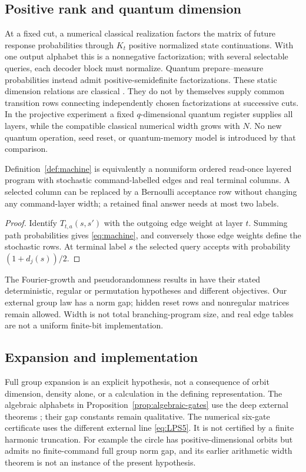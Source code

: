 \subsection{Positive rank and quantum dimension}
At a fixed cut, a numerical classical realization factors the matrix
of future response probabilities through $K_t$ positive normalized
state continuations. With one output alphabet this is a nonnegative
factorization; with several selectable queries, each decoder block
must normalize. Quantum prepare--measure probabilities instead admit
positive-semidefinite factorizations. These static dimension
relations are classical \cite{FMPST}. They do not by themselves
supply common transition rows connecting independently chosen
factorizations at successive cuts. In the projective experiment a
fixed $q$-dimensional quantum register supplies all layers, while the
compatible classical numerical width grows with $N$. No new quantum
operation, seed reset, or quantum-memory model is introduced by that
comparison.

\begin{proposition}\label{prop:program}
Definition~\ref{def:machine} is equivalently a nonuniform ordered
read-once layered program with stochastic command-labelled edges and
real terminal columns. A selected column can be replaced by a
Bernoulli acceptance row without changing any command-layer width;
a retained final answer needs at most two labels.
\end{proposition}
\begin{proof}
Identify $T_{t,a}(s,s')$ with the outgoing edge weight at layer $t$.
Summing path probabilities gives \eqref{eq:machine}, and conversely
those edge weights define the stochastic rows. At terminal label $s$
the selected query accepts with probability $(1+d_j(s))/2$.
\end{proof}
The Fourier-growth and pseudorandomness results in
\cite{RSV,SVW,LPV} have their stated deterministic, regular or
permutation hypotheses and different objectives. Our external group
law has a norm gap; hidden reset rows and nonregular matrices remain
allowed. Width is not total branching-program size, and real edge
tables are not a uniform finite-bit implementation.

\subsection{Expansion and implementation}
Full group expansion is an explicit hypothesis, not a consequence of
orbit dimension, density alone, or a calculation in the defining
representation. The algebraic alphabets in
Proposition~\ref{prop:algebraic-gates} use the deep external theorems
\cite{BdS,BG12}; their gap constants remain qualitative. The numerical
six-gate certificate uses the different external line
\eqref{eq:LPS5}. It is not certified by a finite harmonic truncation.
For example the circle has positive-dimensional orbits but admits
no finite-command full group norm gap, and its earlier arithmetic
width theorem is not an instance of the present hypothesis.

